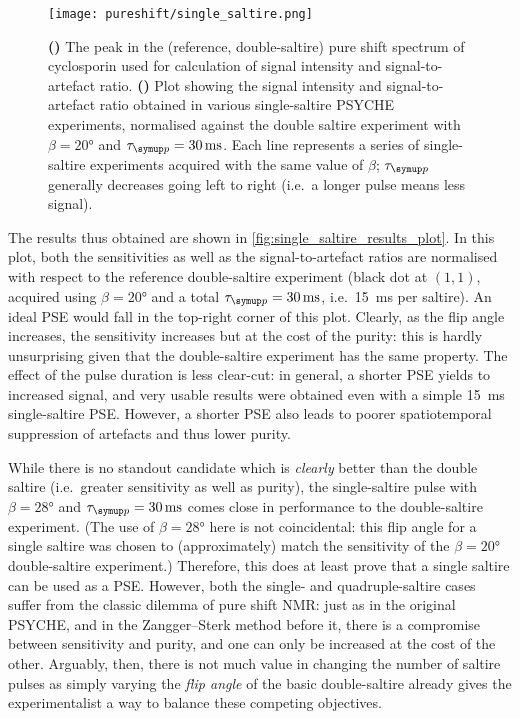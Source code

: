 \begin{figure}[htb]
    \centering
    \texttt{[image: pureshift/single\_saltire.png]}%
    {\label{fig:single_saltire_results_spec}}%
    {\label{fig:single_saltire_results_plot}}%
    \caption[Single-saltire PSYCHE results]{
        \textbf{()} The peak in the (reference, double-saltire) pure shift spectrum of cyclosporin used for calculation of signal intensity and signal-to-artefact ratio.
        \textbf{()} Plot showing the signal intensity and signal-to-artefact ratio obtained in various single-saltire PSYCHE experiments, normalised against the double saltire experiment with $\beta = \ang{20}$ and $\taup = \qty{30}{\ms}$.
        Each line represents a series of single-saltire experiments acquired with the same value of $\beta$; $\taup$ generally decreases going left to right (i.e.\ a longer pulse means less signal). 
    }
    \label{fig:single_saltire_results}
\end{figure}

The results thus obtained are shown in \cref{fig:single_saltire_results_plot}.
In this plot, both the sensitivities as well as the signal-to-artefact ratios are normalised with respect to the reference double-saltire experiment (black dot at $(1, 1)$, acquired using $\beta = \ang{20}$ and a total $\taup = \qty{30}{\ms}$, i.e.\ \qty{15}{\ms} per saltire).
An ideal PSE would fall in the top-right corner of this plot.
Clearly, as the flip angle increases, the sensitivity increases but at the cost of the purity: this is hardly unsurprising given that the double-saltire experiment has the same property.
The effect of the pulse duration is less clear-cut: in general, a shorter PSE yields to increased signal, and very usable results were obtained even with a simple \qty{15}{\ms} single-saltire PSE.
However, a shorter PSE also leads to poorer spatiotemporal suppression of artefacts and thus lower purity.

While there is no standout candidate which is \textit{clearly} better than the double saltire (i.e.\ greater sensitivity as well as purity), the single-saltire pulse with $\beta = \ang{28}$ and $\taup = \qty{30}{\ms}$ comes close in performance to the double-saltire experiment.
(The use of $\beta = \ang{28}$ here is not coincidental: this flip angle for a single saltire was chosen to (approximately) match the sensitivity of the $\beta = \ang{20}$ double-saltire experiment.)
Therefore, this does at least prove that a single saltire can be used as a PSE.
However, both the single- and quadruple-saltire cases suffer from the classic dilemma of pure shift NMR: just as in the original PSYCHE, and in the Zangger--Sterk method before it, there is a compromise between sensitivity and purity, and one can only be increased at the cost of the other.
Arguably, then, there is not much value in changing the number of saltire pulses as simply varying the \textit{flip angle} of the basic double-saltire already gives the experimentalist a way to balance these competing objectives.
